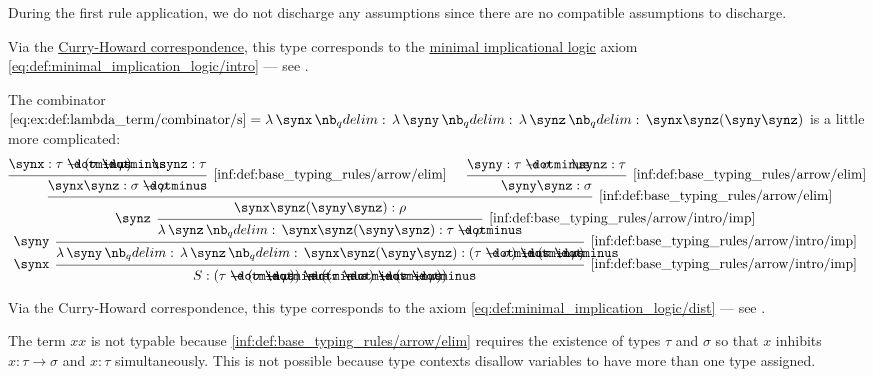 \begin{example}
\begin{thmenum}
    During the first rule application, we do not discharge any assumptions since there are no compatible assumptions to discharge.

    Via the \hyperref[con:curry_howard_correspondence]{Curry-Howard correspondence}, this type corresponds to the \hyperref[def:minimal_implication_logic]{minimal implicational logic} axiom \eqref{eq:def:minimal_implication_logic/intro} --- see .

     The combinator \( \ref{eq:ex:def:lambda_term/combinator/s} = \qabs \synx \qabs \syny \qabs \synz \synx \synz (\syny \synz) \) is a little more complicated:
    \begin{equation*}
      \begin{prooftree}
        \hypo{ \synx: \tau \synimplies (\sigma \synimplies \rho) }
        \hypo{ \synz: \tau }
        \infer2[\ref{inf:def:base_typing_rules/arrow/elim}]{ \synx \synz: \sigma \synimplies \rho }

        \hypo{ \syny: \tau \synimplies \sigma }
        \hypo{ \synz: \tau }
        \infer2[\ref{inf:def:base_typing_rules/arrow/elim}]{ \syny \synz: \sigma }

        \infer2[\ref{inf:def:base_typing_rules/arrow/elim}]{ \synx \synz (\syny \synz): \rho }
        \infer[left label=\( \synz \)]1[\ref{inf:def:base_typing_rules/arrow/intro/imp}]{ \qabs \synz \synx \synz (\syny \synz): \tau \synimplies \rho }
        \infer[left label=\( \syny \)]1[\ref{inf:def:base_typing_rules/arrow/intro/imp}]{ \qabs \syny \qabs \synz \synx \synz (\syny \synz): (\tau \synimplies \sigma) \synimplies (\tau \synimplies \rho) }
        \infer[left label=\( \synx \)]1[\ref{inf:def:base_typing_rules/arrow/intro/imp}]{ S: (\tau \synimplies (\sigma \synimplies \rho)) \synimplies ((\tau \synimplies \sigma) \synimplies (\tau \synimplies \rho)) }
      \end{prooftree}
    \end{equation*}

    Via the Curry-Howard correspondence, this type corresponds to the axiom \eqref{eq:def:minimal_implication_logic/dist} --- see .

     The term \( xx \) is not typable because \ref{inf:def:base_typing_rules/arrow/elim} requires the existence of types \( \tau \) and \( \sigma \) so that \( x \) inhibits \( x: \tau \to \sigma \) and \( x: \tau \) simultaneously. This is not possible because type contexts disallow variables to have more than one type assigned.


\end{thmenum}
\end{example}
